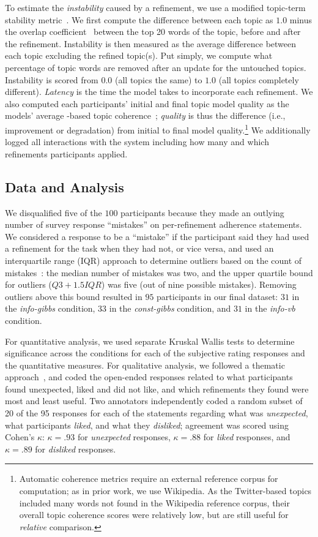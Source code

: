 To estimate the \textit{instability} caused by a refinement, we use a modified topic-term stability metric~\cite{belford2018stability}. We first compute the difference between each topic as $1.0$ minus the overlap coefficient~\cite{M.K2016AMining} between the top 20 words of the topic, before and after the refinement. Instability is then measured as the average difference between each topic excluding the refined topic(s). Put simply, we compute what percentage of topic words are removed after an update for the untouched topics. Instability is scored from $0.0$ (all topics the same) to $1.0$ (all topics completely different). 
\textit{Latency} is the time the model takes to incorporate each refinement. 
We also computed each participants' initial and final topic model quality as the models' average
\npmi{}-based topic coherence~\cite{Lau2014MachineQuality}; \textit{quality} is thus the difference (i.e., improvement or degradation) from initial to final model quality.\footnote{Automatic coherence metrics require an external reference corpus for \npmi{} computation; as in prior work, we use Wikipedia.  As the Twitter-based topics included many words not found in the
Wikipedia reference corpus, their overall topic coherence scores were
relatively low, but are still useful for \emph{relative} comparison.} We additionally logged all interactions with the system including how
many and which refinements participants applied.

\subsection{Data and Analysis}
\label{sec:analysis}
We disqualified five of the $100$ participants because they made an outlying number of survey
response ``mistakes'' on per-refinement adherence statements. We considered a response to be a ``mistake'' if
the participant said they had used a refinement for the task when they had not, or vice versa, and
used an interquartile range (IQR) approach to determine outliers based on the count of mistakes~\cite{Tukey1977ExploratorySection}: the median
number of mistakes was two, and the upper
quartile bound for outliers ($Q3 + 1.5IQR$) was five (out of nine
possible mistakes). Removing outliers above this bound resulted in $95$ participants in our final dataset: $31$ in the \textit{info-gibbs} condition, $33$ in the
\textit{const-gibbs} condition, and $31$ in the \textit{info-vb}
condition.  

For quantitative analysis, we used separate Kruskal Wallis tests to determine significance across the conditions for each of the subjective rating responses and the quantitative measures. For qualitative analysis, we followed a thematic
approach~\cite{Braun2006UsingPsychology}, and coded the open-ended responses related to what participants found unexpected, liked and did not like, and which refinements they found were most and least useful. Two annotators independently coded a random subset of 20 of the 95 responses for each of the statements regarding what was \textit{unexpected}, what participants \textit{liked}, and what they \textit{disliked}; agreement was scored using Cohen's $\kappa$: $\kappa=.93$ for \textit{unexpected} responses, $\kappa=.88$ for \textit{liked} responses, and $\kappa=.89$ for \textit{disliked} responses.
